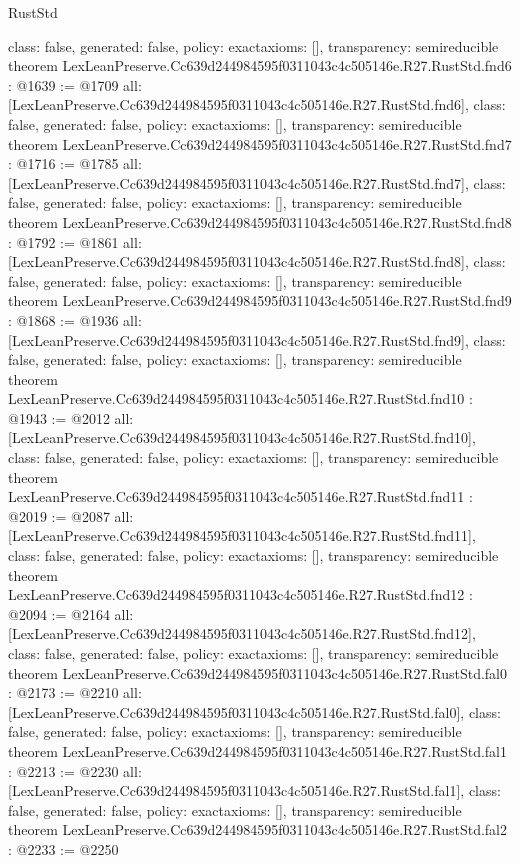 \begin{lexlean}{RustStd}
\begin{coremodule}
{  class: false,
  generated: false,
  policy: exact{axioms: []},
  transparency: semireducible
}
theorem LexLeanPreserve.Cc639d244984595f0311043c4c505146e.R27.RustStd.fnd6 : @1639 := @1709 {
  all: [LexLeanPreserve.Cc639d244984595f0311043c4c505146e.R27.RustStd.fnd6],
  class: false,
  generated: false,
  policy: exact{axioms: []},
  transparency: semireducible
}
theorem LexLeanPreserve.Cc639d244984595f0311043c4c505146e.R27.RustStd.fnd7 : @1716 := @1785 {
  all: [LexLeanPreserve.Cc639d244984595f0311043c4c505146e.R27.RustStd.fnd7],
  class: false,
  generated: false,
  policy: exact{axioms: []},
  transparency: semireducible
}
theorem LexLeanPreserve.Cc639d244984595f0311043c4c505146e.R27.RustStd.fnd8 : @1792 := @1861 {
  all: [LexLeanPreserve.Cc639d244984595f0311043c4c505146e.R27.RustStd.fnd8],
  class: false,
  generated: false,
  policy: exact{axioms: []},
  transparency: semireducible
}
theorem LexLeanPreserve.Cc639d244984595f0311043c4c505146e.R27.RustStd.fnd9 : @1868 := @1936 {
  all: [LexLeanPreserve.Cc639d244984595f0311043c4c505146e.R27.RustStd.fnd9],
  class: false,
  generated: false,
  policy: exact{axioms: []},
  transparency: semireducible
}
theorem LexLeanPreserve.Cc639d244984595f0311043c4c505146e.R27.RustStd.fnd10 : @1943 := @2012 {
  all: [LexLeanPreserve.Cc639d244984595f0311043c4c505146e.R27.RustStd.fnd10],
  class: false,
  generated: false,
  policy: exact{axioms: []},
  transparency: semireducible
}
theorem LexLeanPreserve.Cc639d244984595f0311043c4c505146e.R27.RustStd.fnd11 : @2019 := @2087 {
  all: [LexLeanPreserve.Cc639d244984595f0311043c4c505146e.R27.RustStd.fnd11],
  class: false,
  generated: false,
  policy: exact{axioms: []},
  transparency: semireducible
}
theorem LexLeanPreserve.Cc639d244984595f0311043c4c505146e.R27.RustStd.fnd12 : @2094 := @2164 {
  all: [LexLeanPreserve.Cc639d244984595f0311043c4c505146e.R27.RustStd.fnd12],
  class: false,
  generated: false,
  policy: exact{axioms: []},
  transparency: semireducible
}
theorem LexLeanPreserve.Cc639d244984595f0311043c4c505146e.R27.RustStd.fal0 : @2173 := @2210 {
  all: [LexLeanPreserve.Cc639d244984595f0311043c4c505146e.R27.RustStd.fal0],
  class: false,
  generated: false,
  policy: exact{axioms: []},
  transparency: semireducible
}
theorem LexLeanPreserve.Cc639d244984595f0311043c4c505146e.R27.RustStd.fal1 : @2213 := @2230 {
  all: [LexLeanPreserve.Cc639d244984595f0311043c4c505146e.R27.RustStd.fal1],
  class: false,
  generated: false,
  policy: exact{axioms: []},
  transparency: semireducible
}
theorem LexLeanPreserve.Cc639d244984595f0311043c4c505146e.R27.RustStd.fal2 : @2233 := @2250 {
}
\end{coremodule}
\end{lexlean}
